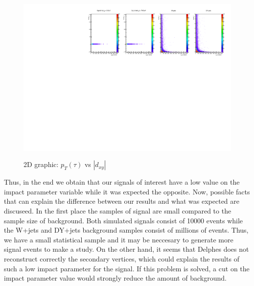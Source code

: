   \begin{figure}[h] 
 \centering
 \caption{2D graphic: $p_T(\tau)$ vs $|d_{xy}|$}
 \includegraphics[width=1.1\textwidth]{./Capitulos/Analysis/ipt1_pt} 
 \label{ipt1_pt}
 \end{figure}
 
Thus, in the end we obtain that our signals of interest have a low value on the impact parameter variable while it was expected the opposite. Now, possible facts that can explain the difference between our results and what was expected are discuseed. In the first place the samples of signal are small compared to the sample size of background. Both simulated signals consist of 10000 events while the W+jets and DY+jets background samples consist of millions of events. Thus, we have a small statistical sample and it may be neccesary to generate more signal events to make a study. On the other hand, it seems that Delphes does not reconstruct correctly the secondary vertices, which could explain the results of such a low impact parameter for the signal. If this problem is solved, a cut on the impact parameter value would strongly reduce the amount of background.




